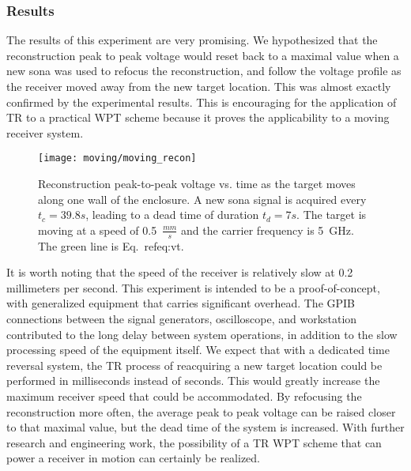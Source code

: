 \subsubsection{Results}
\label{moving-results}

The results of this experiment are very promising. We hypothesized that the reconstruction peak to peak voltage would reset back to a maximal value when a new sona was used to refocus the reconstruction, and follow the voltage profile as the receiver moved away from the new target location. This was almost exactly confirmed by the experimental results. This is encouraging for the application of TR to a practical WPT scheme because it proves the applicability to a moving receiver system.

\begin{figure}[t]
\centering
\texttt{[image: moving/moving\_recon]}
    \caption[Peak-to-peak voltage of moving reconstructions]{Reconstruction peak-to-peak voltage vs. time as the target moves along one wall of the enclosure. A new sona signal is acquired every $t_c = 39.8s$, leading to a dead time of duration $t_d = 7s$. The target is moving at a speed of 0.5~$\frac{mm}{s}$ and the carrier frequency is 5~GHz. The green line is Eq.~ref{eq:vt}.}
    \label{fig:moving-recon}
\end{figure}

It is worth noting that the speed of the receiver is relatively slow at 0.2 millimeters per second. This experiment is intended to be a proof-of-concept, with generalized equipment that carries significant overhead. The GPIB connections between the signal generators, oscilloscope, and workstation contributed to the long delay between system operations, in addition to the slow processing speed of the equipment itself. We expect that with a dedicated time reversal system, the TR process of reacquiring a new target location could be performed in milliseconds instead of seconds. This would greatly increase the maximum receiver speed that could be accommodated. By refocusing the reconstruction more often, the average peak to peak voltage can be raised closer to that maximal value, but the dead time of the system is increased. With further research and engineering work, the possibility of a TR WPT scheme that can power a receiver in motion can certainly be realized. 
